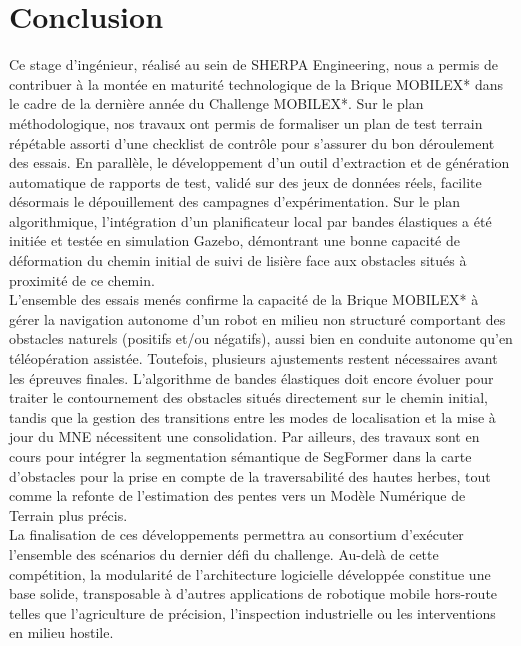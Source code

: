 \section*{Conclusion}

Ce stage d'ingénieur, réalisé au sein de SHERPA Engineering, nous a permis de contribuer à la montée en maturité technologique de la Brique MOBILEX* dans le cadre de la dernière année du Challenge MOBILEX*. Sur le plan méthodologique, nos travaux ont permis de formaliser un plan de test terrain répétable assorti d'une checklist de contrôle pour s'assurer du bon déroulement des essais. En parallèle, le développement d'un outil d'extraction et de génération automatique de rapports de test, validé sur des jeux de données réels, facilite désormais le dépouillement des campagnes d'expérimentation. Sur le plan algorithmique, l'intégration d'un planificateur local par bandes élastiques a été initiée et testée en simulation Gazebo, démontrant une bonne capacité de déformation du chemin initial de suivi de lisière face aux obstacles situés à proximité de ce chemin.\\

L'ensemble des essais menés confirme la capacité de la Brique MOBILEX* à gérer la navigation autonome d'un robot en milieu non structuré comportant des obstacles naturels (positifs et/ou négatifs), aussi bien en conduite autonome qu'en téléopération assistée. Toutefois, plusieurs ajustements restent nécessaires avant les épreuves finales. L'algorithme de bandes élastiques doit encore évoluer pour traiter le contournement des obstacles situés directement sur le chemin initial, tandis que la gestion des transitions entre les modes de localisation et la mise à jour du MNE nécessitent une consolidation. Par ailleurs, des travaux sont en cours pour intégrer la segmentation sémantique de SegFormer dans la carte d'obstacles pour la prise en compte de la traversabilité des hautes herbes, tout comme la refonte de l'estimation des pentes vers un Modèle Numérique de Terrain plus précis.\\

La finalisation de ces développements permettra au consortium d'exécuter l'ensemble des scénarios du dernier défi du challenge. Au-delà de cette compétition, la modularité de l'architecture logicielle développée constitue une base solide, transposable à d'autres applications de robotique mobile hors-route telles que l'agriculture de précision, l'inspection industrielle ou les interventions en milieu hostile.

